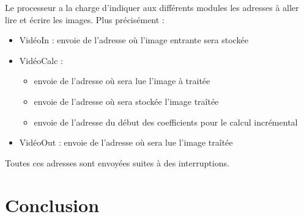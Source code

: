 \documentclass[a4paper,12pt]{report}
\begin{document}
{Le processeur a la charge d'indiquer aux différents modules les adresses à aller lire et écrire les images. Plus précisément :

\begin{itemize}
	\item VidéoIn : envoie de l'adresse où l'image entrante sera stockée
	\item VidéoCalc : \begin{itemize}
								\item envoie de l'adresse où sera lue l'image à traitée
								\item envoie de l'adresse où sera stockée l'image traîtée
								\item envoie de l'adresse du début des coefficients pour le calcul incrémental
							\end{itemize}
	\item VidéoOut : envoie de l'adresse où sera lue l'image traîtée
\end{itemize}

Toutes ces adresses sont envoyées suites à des interruptions.
}



 
    \chapter*{Conclusion}
{}


\end{document}

